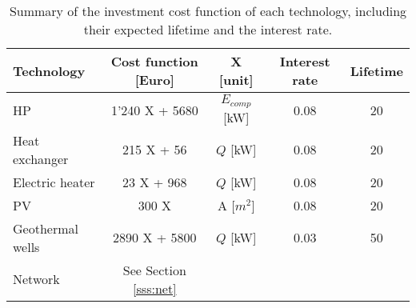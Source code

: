 \begin{table}[htp]
	\centering
	\caption{Summary of the investment cost function of each technology, including their expected lifetime and the interest rate.}
	\label{tab:ic}
	\begin{tabular}{lcccc} \toprule
		\textbf{Technology} & Cost function [Euro] & X  [unit]       & Interest rate & Lifetime \\ \midrule
		HP                  & 1'240 X + 5680       & $E_{comp}$ [kW] & 0.08                              & 20                           \\
		Heat exchanger      & 215 X + 56          & $Q$ [kW]        & 0.08                              & 20                           \\
	 	Electric heater		& 23 X + 968		  &	$Q$ [kW] 		 & 0.08								& 20						   \\
		PV                  & 300 X                & A [$m^{2}$]     & 0.08                              & 20                           \\
		Geothermal wells    & 2890 X + 5800        & $Q$ [kW]        & 0.03                              & 50                  			 \\
		Network				& See Section \ref{sss:net}		&		 &									 &					    \\ \bottomrule     
	\end{tabular}
\end{table}